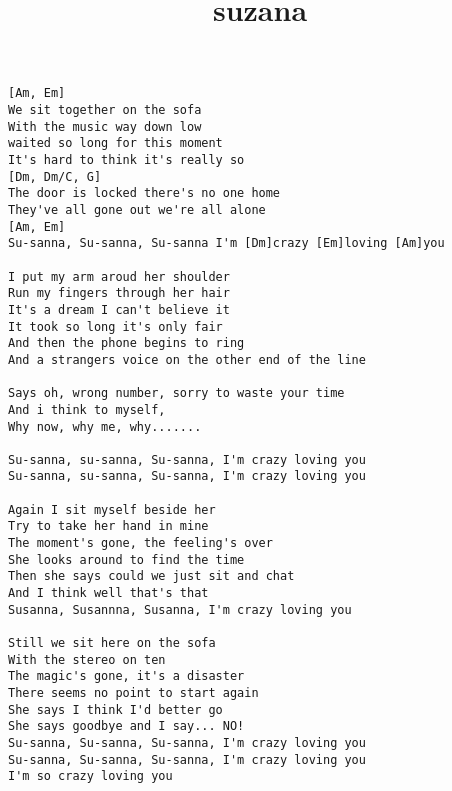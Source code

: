 \author{}
\title{suzana}
\maketitle
\begin{verbatim}
[Am, Em]
We sit together on the sofa
With the music way down low
waited so long for this moment
It's hard to think it's really so
[Dm, Dm/C, G]
The door is locked there's no one home
They've all gone out we're all alone
[Am, Em]
Su-sanna, Su-sanna, Su-sanna I'm [Dm]crazy [Em]loving [Am]you

I put my arm aroud her shoulder
Run my fingers through her hair
It's a dream I can't believe it
It took so long it's only fair
And then the phone begins to ring
And a strangers voice on the other end of the line

Says oh, wrong number, sorry to waste your time
And i think to myself,
Why now, why me, why.......

Su-sanna, su-sanna, Su-sanna, I'm crazy loving you
Su-sanna, su-sanna, Su-sanna, I'm crazy loving you

Again I sit myself beside her
Try to take her hand in mine
The moment's gone, the feeling's over
She looks around to find the time
Then she says could we just sit and chat
And I think well that's that
Susanna, Susannna, Susanna, I'm crazy loving you

Still we sit here on the sofa
With the stereo on ten
The magic's gone, it's a disaster
There seems no point to start again
She says I think I'd better go
She says goodbye and I say... NO!
Su-sanna, Su-sanna, Su-sanna, I'm crazy loving you
Su-sanna, Su-sanna, Su-sanna, I'm crazy loving you
I'm so crazy loving you 
\end{verbatim}